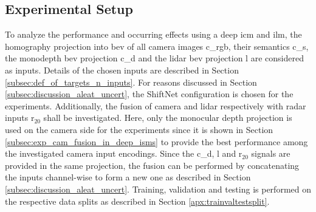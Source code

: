 \subsection{Experimental Setup}
\label{subsec:setup_cam_lidar_fusion_in_deep_isms}
To analyze the performance and occurring effects using a deep \gls{icm} and \gls{ilm}, the homography projection into \gls{bev} of all camera images \gls{c_rgb}, their semantics \gls{c_s}, the \gls{monodepth} \gls{bev} projection \gls{c_d} and the lidar \gls{bev} projection \gls{l} are considered as inputs. Details of the chosen inputs are described in Section \ref{subsec:def_of_targets_n_inputs}. For reasons discussed in Section \ref{subsec:discussion_aleat_uncert}, the ShiftNet configuration is chosen for the experiments. Additionally, the fusion of camera and lidar respectively with radar inputs \gls{r}$_{20}$ shall be investigated. Here, only the monocular depth projection is used on the camera side for the experiments since it is shown in Section \ref{subsec:exp_cam_fusion_in_deep_isms} to provide the best performance among the investigated camera input encodings. Since the \gls{c_d}, \gls{l} and \gls{r}$_{20}$ signals are provided in the same projection, the fusion can be performed by concatenating the inputs channel-wise to form a new one as described in Section \ref{subsec:discussion_aleat_uncert}. Training, validation and testing is performed on the respective data splits as described in Section \ref{apx:trainvaltestsplit}.
%
